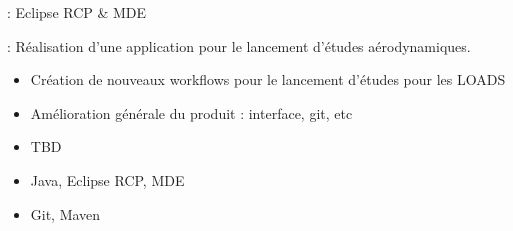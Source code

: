 
 : Eclipse RCP \& MDE

 : Réalisation d'une application pour le lancement d'études aérodynamiques.

\bigskip


\begin{itemize}
\item Création de nouveaux workflows pour le lancement d'études pour les LOADS
\item Amélioration générale du produit : interface, git, etc
\end{itemize} 


\begin{itemize}
\item TBD
\end{itemize} 


\begin{itemize}
\item Java, Eclipse RCP, MDE
\item Git, Maven
\end{itemize} 